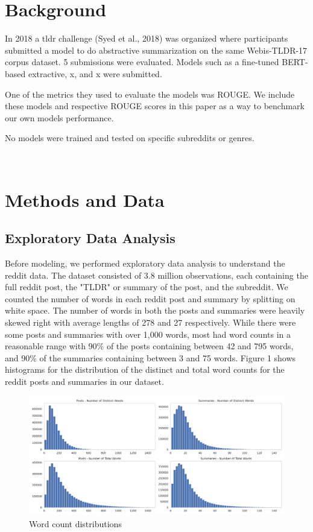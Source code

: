 \documentclass[11pt,a4paper, twocolumn]{article}
\begin{document}
\section{Background}
\label{sec:length}

In 2018 a tldr challenge (Syed et al., 2018) was organized where participants submitted a model to do abstractive summarization on the same Webis-TLDR-17 corpus dataset. 5 submissions were evaluated. Models such as a fine-tuned BERT-based extractive, x, and x were submitted.

One of the metrics they used to evaluate the models was ROUGE. We include these models and respective ROUGE scores in this paper as a way to benchmark our own models performance.

No models were trained and tested on specific subreddits or genres.


\\

\section{Methods and Data}

\subsection{Exploratory Data Analysis}

Before modeling, we performed exploratory data analysis to understand the reddit data. 
The dataset consisted of 3.8 million observations, each containing the full reddit post, the "TLDR" or summary of the post, and the subreddit. 
We counted the number of words in each reddit post and summary by splitting on white space. 
The number of words in both the posts and summaries were heavily skewed right with average lengths of 278 and 27 respectively. 
While there were some posts and summaries with over 1,000 words, most had word counts in a reasonable range with 90\% of the posts containing between 42 and 795 words, and 90\% of the summaries containing between 3 and 75 words. 
Figure 1 shows histograms for the distribution of the distinct and total word counts for the reddit posts and summaries in our dataset. 


\begin{figure}
  \includegraphics[width=\linewidth]{word_counts.png}
  \caption{Word count distributions}
  \label{fig:word_counts}
\end{figure}
\end{document}
